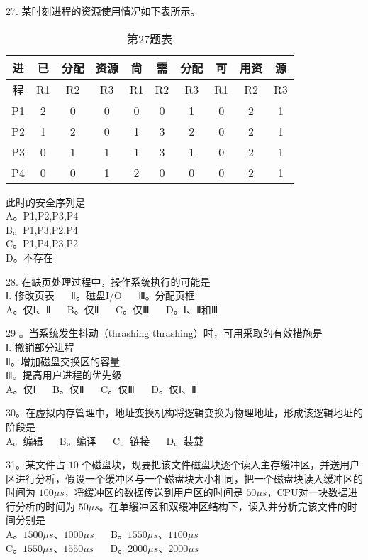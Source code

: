 27. 某时刻进程的资源使用情况如下表所示。 \\
\begin{table}[ht]
\centering
\caption{第27题表}\label{Na11_tab2}
\begin{tabular}{|c|c|c|c|c|c|c|c|c|c|}
\hline
进 & 已 & 分配 & 资源 & 尙 & 需 & 分配 & 可 & 用资 & 源 \\
\hline
程 & R1 & R2 & R3 & R1 & R2 & R3 & R1 & R2 & R3 \\
\hline
P1 & 2 & 0 & 0 & 0 & 0 & 1 & 0 & 2 & 1 \\
\hline
P2 & 1 & 2 & 0 & 1 & 3 & 2 & 0 & 2 & 1 \\
\hline
P3 & 0 & 1 & 1 & 1 & 3 & 1 & 0 & 2 & 1 \\
\hline
P4 & 0 & 0 & 1 & 2 & 0 & 0 & 0 & 2 & 1 \\
\hline
\end{tabular}
\end{table}

此时的安全序列是 \\
A。P1,P2,P3,P4 \\
B。P1,P3,P2,P4 \\
C。P1,P4,P3,P2 \\
D。不存在


28. 在缺页处理过程中，操作系统执行的可能是 \\
Ⅰ. 修改页表 $\quad$ Ⅱ。磁盘I/O $\quad$ Ⅲ。分配页框 \\
A。仅Ⅰ、Ⅱ $\quad$ B。仅Ⅱ $\quad$ C。仅Ⅲ $\quad$ D。Ⅰ、Ⅱ和Ⅲ

29 。当系统发生抖动（thrashing thrashing）时，可用采取的有效措施是 \\
Ⅰ. 撤销部分进程 \\
Ⅱ。增加磁盘交换区的容量 \\
Ⅲ。提高用户进程的优先级 \\
A。仅Ⅰ $\quad$ B。仅Ⅱ $\quad$ C。仅Ⅲ $\quad$ D。仅Ⅰ、Ⅱ

30。在虚拟内存管理中，地址变换机构将逻辑变换为物理地址，形成该逻辑地址的阶段是 \\
A。编辑 $\quad$ B。编译 $\quad$ C。链接 $\quad$ D。装载

31。某文件占 $10$ 个磁盘块，现要把该文件磁盘块逐个读入主存缓冲区，并送用户区进行分析，假设一个缓冲区与一个磁盘块大小相同，把一个磁盘块读入缓冲区的时间为 $100\mu s$，将缓冲区的数据传送到用户区的时间是 $50\mu s$，CPU对一块数据进行分析的时间为 $50\mu s$。在单缓冲区和双缓冲区结构下，读入并分析完该文件的时间分别是 \\
A。$1500\mu s$、$1000\mu s$ $\quad$ B。$1550\mu s$、$1100\mu s$ \\
C。$1550\mu s$、$1550\mu s$ $\quad$ D。$2000\mu s$、$2000\mu s$

